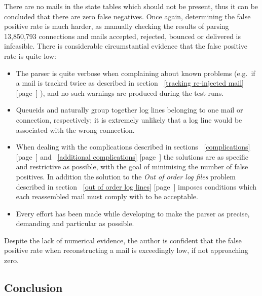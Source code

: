 \documentclass[a4paper,12pt,draft]{article}
\newcommand{\refwithpage}[1]{%
    \empty{}\ref{#1} [page~\pageref{#1}]%
}
\begin{document}
There are no mails in the state tables which should not be present, thus it
can be concluded that there are zero false negatives.  Once again,
determining the false positive rate is much harder, as manually checking
the results of parsing 13,850,793 connections and mails accepted, rejected,
bounced or delivered is infeasible.  There is considerable circumstantial
evidence that the false positive rate is quite low:

\begin{itemize}

    \item The parser is quite verbose when complaining about known problems
        (e.g.\ if a mail is tracked twice as described in
        section~\refwithpage{tracking re-injected mail}), and no such
        warnings are produced during the test runs.

    \item Queueids and \pids{} naturally group together log lines belonging
        to one mail or connection, respectively; it is extremely unlikely
        that a log line would be associated with the wrong connection.

    \item When dealing with the complications described in
        sections~\refwithpage{complications} and~\refwithpage{additional
        complications} the solutions are as specific and restrictive as
        possible, with the goal of minimising the number of false
        positives.  In addition the solution to the \textit{Out of order
        log files\/} problem described in section~\refwithpage{out of order
        log lines} imposes conditions which each reassembled mail must
        comply with to be acceptable.

    \item Every effort has been made while developing to make the parser as
        precise, demanding and particular as possible.

\end{itemize}

Despite the lack of numerical evidence, the author is confident that the
false positive rate when reconstructing a mail is exceedingly low, if not
approaching zero.

\subsection{Conclusion}
\end{document}
